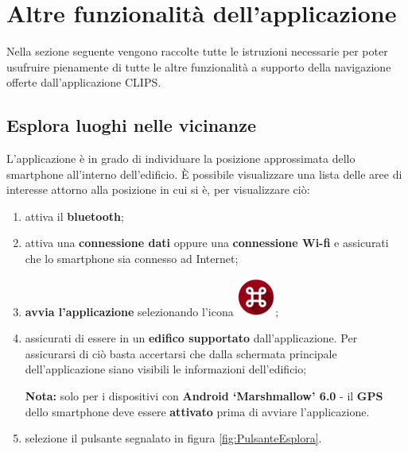 \documentclass[../ClipsManualeUtente.tex]{subfiles}
\begin{document}
\section{Altre funzionalità dell'applicazione}
	Nella sezione seguente vengono raccolte tutte le istruzioni necessarie per poter usufruire pienamente di tutte le altre funzionalità a supporto della navigazione offerte dall'applicazione CLIPS.
	
	\subsection{Esplora luoghi nelle vicinanze}
		L'applicazione è in grado di individuare la posizione approssimata dello smartphone all'interno dell'edificio.
		È possibile visualizzare una lista delle aree di interesse attorno alla posizione in cui si è, per visualizzare ciò:
		\begin{enumerate}
		\item attiva il \textbf{bluetooth};
		\item attiva una \textbf{connessione dati} oppure una \textbf{connessione Wi-fi} e assicurati che lo smartphone sia connesso ad Internet;
		\item \textbf{avvia l'applicazione} selezionando l'icona \includegraphics[scale=0.4]{img/LogoApp};
		\item assicurati di essere in un \textbf{edifico supportato} dall'applicazione. Per assicurarsi di ciò basta accertarsi che dalla schermata principale dell'applicazione siano visibili le informazioni dell'edificio;
		
		\begin{framed}
			\textbf{Nota:} solo per i dispositivi con \textbf{Android `Marshmallow' 6.0} - il \textbf{GPS} dello smartphone deve essere \textbf{attivato} prima di avviare l'applicazione.
		\end{framed}
		
		\item selezione il pulsante segnalato in figura \ref{fig:PulsanteEsplora}.
		\end{enumerate}
		
\end{document}
